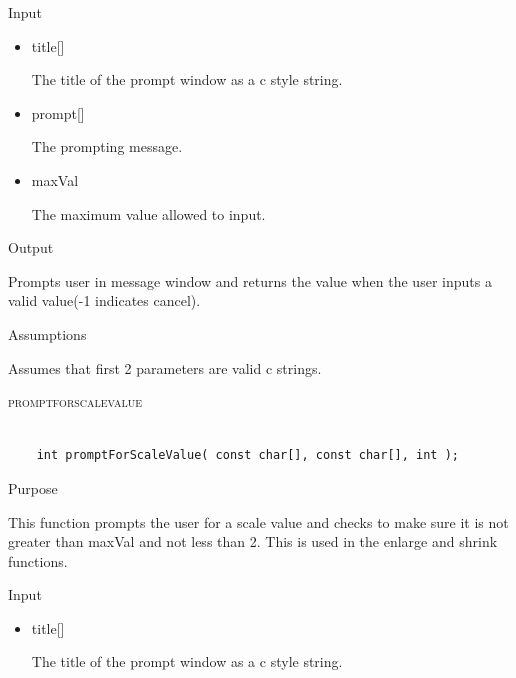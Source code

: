 \documentclass[pdftex, 11pt]{article}
\begin{document}
\begin{description}
\begin{description}
			\item{Input}

				\begin{itemize}
					
					\item{title[]}

						The title of the prompt window as a c style string.

					\item{prompt[]}

						The prompting message.

					\item{maxVal}

						The maximum value allowed to input.

				\end{itemize}

			\item{Output}

				Prompts user in message window and returns the value when
				the user inputs a valid value(-1 indicates cancel).

			\item{Assumptions}

				Assumes that first 2 parameters are valid c strings.

		\end{description}



	\item{\textsc{promptforscalevalue}}

		\begin{lstlisting}

	int promptForScaleValue( const char[], const char[], int );
		\end{lstlisting}

		\begin{description}
			\item{Purpose}

				This function prompts the user for a scale value and checks to make sure it
				is not greater than maxVal and not less than 2.  This is used in the enlarge
				and shrink functions.

			\item{Input}

				\begin{itemize}
					
					\item{title[]}

						The title of the prompt window as a c style string.


\end{itemize}
\end{description}
\end{description}
\end{document}
